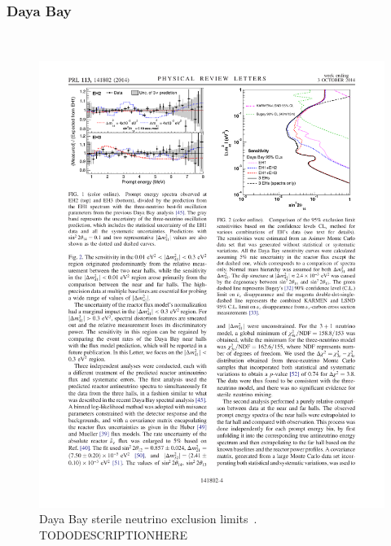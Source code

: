 \documentclass[aps,prd,twocolumn,nofootinbib]{revtex4-1}
\begin{document}
\subsubsection{Daya Bay}

~\cite{DayaBay}

\begin{figure}[H]
 \centering
 \includegraphics[width=1\columnwidth]{../figures/daya1.pdf}
 \caption{Daya Bay sterile neutrino exclusion limits~\cite{DayaBay}. TODODESCRIPTIONHERE}
 \label{fig:DayaBay}
\end{figure}
\end{document}
